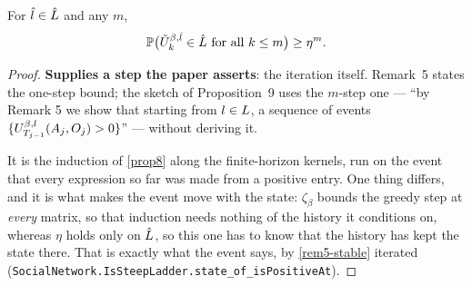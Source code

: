 \begin{lemma}
  \label{rem5-eta-iter}
  \leanok
  For $\hat{l} \in \hat{L}$ and any $m$,
  \[
    \mathbb{P}\bigl( \tilde{U}^{\beta,\hat{l}}_k \in \hat{L} \ \text{for all } k \le m \bigr)
      \ge \eta^m .
  \]
\end{lemma}
\begin{proof}
  \leanok
  \textbf{Supplies a step the paper asserts}: the iteration itself.  Remark~5
  states the one-step bound; the sketch of Proposition~9 uses the $m$-step one
  --- ``by Remark 5 we show that starting from $l \in L$, a sequence of
  events $\{U^{\beta,l}_{T_{j-1}}(A_j,O_j) > 0\}$'' --- without deriving it.

  It is the induction of \ref{prop8} along the finite-horizon kernels, run on
  the event that every expression so far was made from a positive entry.  One
  thing differs, and it is what makes the event move with the state:
  $\zeta_\beta$ bounds the greedy step at \emph{every} matrix, so that
  induction needs nothing of the history it conditions on, whereas $\eta$ holds
  only on $\hat{L}$, so this one has to know that the history has kept the state
  there.  That is exactly what the event says, by \ref{rem5-stable} iterated
  (\texttt{SocialNetwork.IsSteepLadder.state\_of\_isPositiveAt}).
\end{proof}

